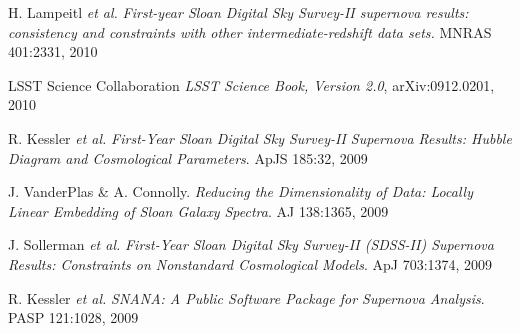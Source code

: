 \documentclass{article} %
\def\sl{\slshape}
\begin{document}
{\begin{itemize}[leftmargin=0ex, itemsep=0ex, parsep=.5ex, labelindent=-4ex]
    \publication
      H. Lampeitl {\sl et al.}
      {\sl First-year Sloan Digital Sky Survey-II supernova results:
      consistency and constraints with other intermediate-redshift data sets.}
      MNRAS 401:2331, 2010

    \publication
      LSST Science Collaboration
      {\sl LSST Science Book, Version 2.0}, arXiv:0912.0201, 2010

    \publication
      R. Kessler {\it et al.}
      {\it First-Year Sloan Digital Sky Survey-II Supernova Results:
      Hubble Diagram and Cosmological Parameters}.
      ApJS 185:32, 2009

    \publication
      J. VanderPlas \& A. Connolly.
      {\it Reducing the Dimensionality of Data: Locally
      Linear Embedding of Sloan Galaxy Spectra}.
      AJ 138:1365, 2009

    \publication
      J. Sollerman {\sl et al.}
      {\it First-Year Sloan Digital Sky Survey-II (SDSS-II) Supernova
      Results: Constraints on Nonstandard Cosmological Models}.
      ApJ 703:1374, 2009

    \publication
      R. Kessler {\it et al.}
      {\it SNANA: A Public Software Package for Supernova Analysis}.
      PASP 121:1028, 2009

  \end{itemize}
}
\end{document}

